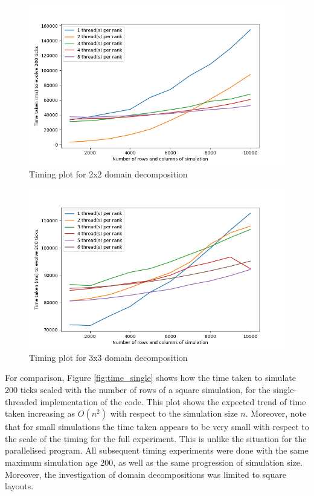 \documentclass[12pt]{article}
\begin{document}
\begin{figure}[hp]
    \includegraphics[scale=0.65, center]{figures/time_hybrid_r4_plot.png}
    \caption{Timing plot for 2x2 domain decomposition}
    \label{fig:time_r4}
\end{figure}

\begin{figure}[hp]
    \includegraphics[scale=0.65, center]{figures/time_hybrid_r9_plot.png}
    \caption{Timing plot for 3x3 domain decomposition}
    \label{fig:time_r9}
\end{figure}

For comparison, Figure \ref{fig:time_single} shows how the time taken to simulate 200 ticks scaled with the number of rows of a square simulation,
for the single-threaded implementation of the code.
This plot shows the expected trend of time taken increasing as $O(n^2)$ with respect to the simulation size $n$.
Moreover, note that for small simulations the time taken appears to be very small with respect to the scale of the timing for the full experiment.
This is unlike the situation for the parallelised program.
All subsequent timing experiments were done with the same maximum simulation age 200, as well as the same progression of simulation size.
Moreover, the investigation of domain decompositions was limited to square layouts.
\end{document}
